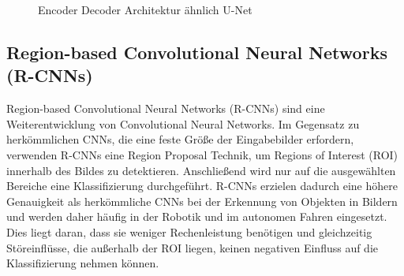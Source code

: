 \begin{figure}
    \centering
    
    \caption{Encoder Decoder Architektur ähnlich U-Net}
    \label{fig:meinbild}
\end{figure}

\subsection{Region-based Convolutional Neural Networks (R-CNNs)}
Region-based Convolutional Neural Networks (R-CNNs) sind eine Weiterentwicklung
von Convolutional Neural Networks. Im Gegensatz zu herkömmlichen CNNs, die eine
feste Größe der Eingabebilder erfordern, verwenden R-CNNs eine Region Proposal
Technik, um Regions of Interest (ROI) innerhalb des Bildes zu detektieren.
Anschließend wird nur auf die ausgewählten Bereiche eine Klassifizierung
durchgeführt. R-CNNs erzielen dadurch eine höhere Genauigkeit als herkömmliche
CNNs bei der Erkennung von Objekten in Bildern und werden daher häufig in der
Robotik und im autonomen Fahren eingesetzt. Dies liegt daran, dass sie weniger
Rechenleistung benötigen und gleichzeitig Störeinflüsse, die außerhalb der ROI
liegen, keinen negativen Einfluss auf die Klassifizierung nehmen können. \cite{8237548}